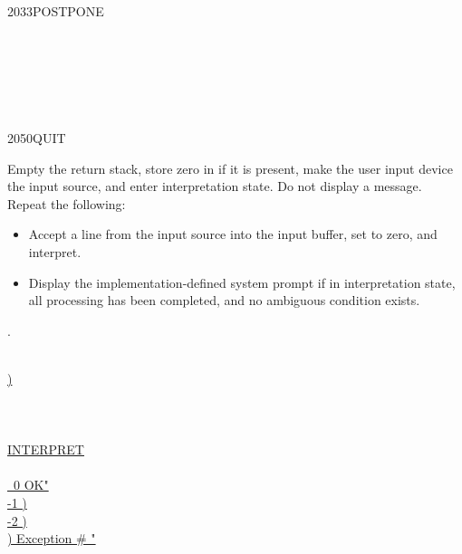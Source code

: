 \begin{worddef}{2033}{POSTPONE}
	\begin{testing} %
		 \\
		 \\

		 \\
		 \\
	\end{testing}
\end{worddef}


\begin{worddef}{2050}{QUIT}
\item \stack{}{}

	Empty the return stack, store zero in  if it is
	present, make the user input device the input source, and enter
	interpretation state. Do not display a message. Repeat the
	following:
	\begin{itemize}
	\item Accept a line from the input source into the input buffer,
		set  to zero, and interpret.
	\item Display the implementation-defined system prompt if in
		interpretation state, all processing has been completed,
		and no ambiguous condition exists.
	\end{itemize}

\see {}.

	\begin{implement}
\cbstart{}
		\uline{\word{:} } \\
		\tab \uline{  )} \\
		\tab \uline{ \word{[}} \\
		\tab[2] \uline{} \\
		\tab \uline{} \\
		\tab[2] \uline{\word{[']} INTERPRET } \\
		\tab[2] \uline{} \\
		\tab[2] \uline{~0     
			 OK"   } \\
		\tab[2] \uline{-1    ) } \\
		\tab[2] \uline{-2    ) } \\
		\tab[2] \uline{  )   Exception \# " } \\
		\tab[2] \uline{} \\
		\tab \uline{ } \\
		\uline{\word{;}}


\end{implement}
\end{worddef}
